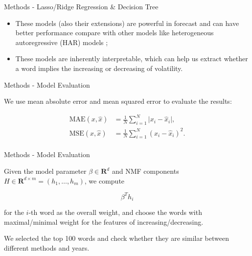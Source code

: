 \documentclass{beamer}
\begin{document}
\begin{frame}{Methods - Lasso/Ridge Regression \& Decision Tree}

  \begin{itemize}
    \item These models (also their extensions) are powerful in forecast and can have better performance compare with other models like heterogeneous autoregressive (HAR) models   ; \vspace{.25cm}
    \item These models are inherently interpretable, which can help us extract whether a word implies the increasing or decreasing of volatility.
  \end{itemize}

\end{frame}

\begin{frame}{Methods - Model Evaluation}

  We use mean absolute error and mean squared error to evaluate the results: \vspace{.25cm}

  $$
    \begin{aligned}
      \text{MAE}(x, \hat{x}) & = \frac{1}{N} \sum_{i=1}^N \vert x_i - \hat{x}_i \vert, \\
      \text{MSE}(x, \hat{x}) & = \frac{1}{N} \sum_{i=1}^N  (x_i - \hat{x}_i)^2.        \\
    \end{aligned}
  $$

\end{frame}

\begin{frame}{Methods - Model Evaluation}

  Given the model parameter $\beta \in \mathbf{R}^d$ and NMF components $H \in \mathbf{R}^{d \times m} = (h_1, \dots, h_m)$, we compute \vspace{.25cm}

  $$
    \beta^T h_i
  $$ \vspace{.25cm}

  for the $i$-th word as the overall weight, and choose the words with maximal/minimal weight for the features of increasing/decreasing.

  We selected the top 100 words and check whether they are similar between different methods and years.

\end{frame}
\end{document}
